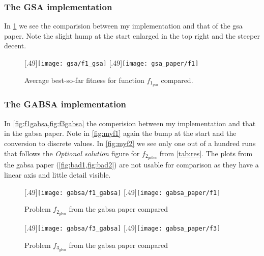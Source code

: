  
 
%
\subsubsection*{The GSA implementation}
In \cref{fig:f1} we see the comparision between my implementation and that of the \ac{gsa} paper. Note the slight hump at the start enlarged in the top right and the steeper decent.
%
\begin{figure}
	\centering
		[.49\linewidth]{\texttt{[image: gsa/f1\_gsa]}}
		[.49\linewidth]{\texttt{[image: gsa\_paper/f1]}}
	\caption{Average best-so-far fitness for function $f_{1_{gsa}}$ compared.}
    \label{fig:f1}
\end{figure}
%
\subsubsection*{The GABSA implementation}
In \cref{fig:f1gabsa,fig:f3gabsa} the comperision between my implementation and that in the \ac{gabsa} paper. Note in \cref{fig:myf1} again the bump at the start and the conversion to discrete values. In \cref{fig:myf2} we see only one out of a hundred runs that follows the \textit{Optional solution} figure for $f_{2_{gabsa}}$ from \cref{tab:res}. The plots from the \ac{gabsa} paper (\cref{fig:bad1,fig:bad2}) are not usable for comparison as they have a linear axis and little detail visible.
%
\begin{figure}
	\centering
		[.49\linewidth]{\texttt{[image: gabsa/f1\_gabsa]}}
		[.49\linewidth]{\texttt{[image: gabsa\_paper/f1]}}
	\caption{Problem $f_{2_{gbsa}}$ from the \ac{gabsa} paper\cite{GBSA} compared}
    \label{fig:f1gabsa}
\end{figure}
%
\begin{figure}
	\centering
		[.49\linewidth]{\texttt{[image: gabsa/f3\_gabsa]}}
		[.49\linewidth]{\texttt{[image: gabsa\_paper/f3]}}
	\caption{Problem $f_{3_{gbsa}}$ from the \ac{gabsa} paper\cite{GBSA} compared}
    \label{fig:f3gabsa}
\end{figure}
%
